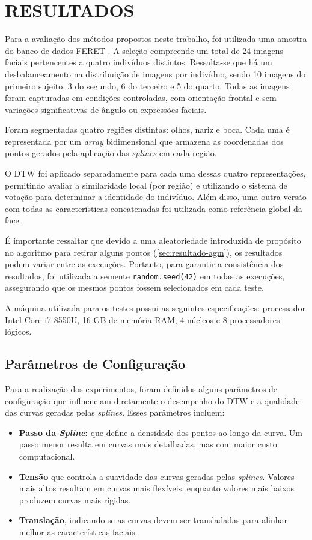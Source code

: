 \chapter{RESULTADOS} \label{cha:resultados}

Para a avaliação dos métodos propostos neste trabalho, foi utilizada uma amostra do banco de dados FERET \cite{FERET1,FERET2}. A seleção compreende um total de 24 imagens faciais pertencentes a quatro indivíduos distintos. Ressalta-se que há um desbalanceamento na distribuição de imagens por indivíduo, sendo 10 imagens do primeiro sujeito, 3 do segundo, 6 do terceiro e 5 do quarto. Todas as imagens foram capturadas em condições controladas, com orientação frontal e sem variações significativas de ângulo ou expressões faciais.

Foram segmentadas quatro regiões distintas: olhos, nariz e boca. Cada uma é representada por um \textit{array} bidimensional que armazena as coordenadas dos pontos gerados pela aplicação das \textit{splines} em cada região.


O DTW foi aplicado separadamente para cada uma dessas quatro representações, permitindo avaliar a similaridade local (por região) e utilizando o sistema de votação para determinar a identidade do indivíduo. Além disso, uma outra versão com todas as características concatenadas foi utilizada como referência global da face.

É importante ressaltar que devido a uma aleatoriedade introduzida de propósito no algoritmo para retirar alguns pontos (\autoref{sec:resultado-agm}), os resultados podem variar entre as execuções. Portanto, para garantir a consistência dos resultados, foi utilizada a semente \texttt{random.seed(42)} em todas as execuções, assegurando que os mesmos pontos fossem selecionados em cada teste.

A máquina utilizada para os testes possui as seguintes especificações: processador Intel Core i7-8550U, 16 GB de memória RAM, 4 núcleos e 8 processadores lógicos.

\section{Parâmetros de Configuração}
\label{sec:parametros-configuracao}

Para a realização dos experimentos, foram definidos alguns parâmetros de configuração que influenciam diretamente o desempenho do DTW e a qualidade das curvas geradas pelas \textit{splines}. Esses parâmetros incluem:
\begin{itemize}
    \item \textbf{Passo da \textit{Spline}:} que define a densidade dos pontos ao longo da curva. Um passo menor resulta em curvas mais detalhadas, mas com maior custo computacional.
    \item \textbf{Tensão} que controla a suavidade das curvas geradas pelas \textit{splines}. Valores mais altos resultam em curvas mais flexíveis, enquanto valores mais baixos produzem curvas mais rígidas. %
    \item \textbf{Translação}, indicando se as curvas devem ser transladadas para alinhar melhor as características faciais.
\end{itemize}

